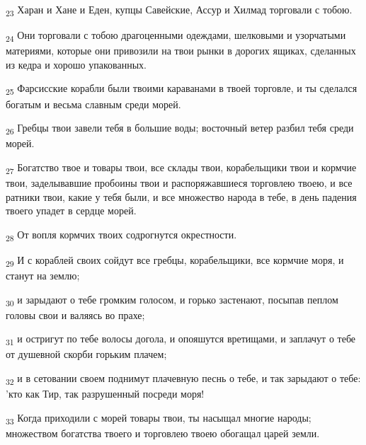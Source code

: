 \begin{tcolorbox}
\textsubscript{23} Харан и Хане и Еден, купцы Савейские, Ассур и Хилмад торговали с тобою.
\end{tcolorbox}
\begin{tcolorbox}
\textsubscript{24} Они торговали с тобою драгоценными одеждами, шелковыми и узорчатыми материями, которые они привозили на твои рынки в дорогих ящиках, сделанных из кедра и хорошо упакованных.
\end{tcolorbox}
\begin{tcolorbox}
\textsubscript{25} Фарсисские корабли были твоими караванами в твоей торговле, и ты сделался богатым и весьма славным среди морей.
\end{tcolorbox}
\begin{tcolorbox}
\textsubscript{26} Гребцы твои завели тебя в большие воды; восточный ветер разбил тебя среди морей.
\end{tcolorbox}
\begin{tcolorbox}
\textsubscript{27} Богатство твое и товары твои, все склады твои, корабельщики твои и кормчие твои, заделывавшие пробоины твои и распоряжавшиеся торговлею твоею, и все ратники твои, какие у тебя были, и все множество народа в тебе, в день падения твоего упадет в сердце морей.
\end{tcolorbox}
\begin{tcolorbox}
\textsubscript{28} От вопля кормчих твоих содрогнутся окрестности.
\end{tcolorbox}
\begin{tcolorbox}
\textsubscript{29} И с кораблей своих сойдут все гребцы, корабельщики, все кормчие моря, и станут на землю;
\end{tcolorbox}
\begin{tcolorbox}
\textsubscript{30} и зарыдают о тебе громким голосом, и горько застенают, посыпав пеплом головы свои и валяясь во прахе;
\end{tcolorbox}
\begin{tcolorbox}
\textsubscript{31} и остригут по тебе волосы догола, и опояшутся вретищами, и заплачут о тебе от душевной скорби горьким плачем;
\end{tcolorbox}
\begin{tcolorbox}
\textsubscript{32} и в сетовании своем поднимут плачевную песнь о тебе, и так зарыдают о тебе: 'кто как Тир, так разрушенный посреди моря!
\end{tcolorbox}
\begin{tcolorbox}
\textsubscript{33} Когда приходили с морей товары твои, ты насыщал многие народы; множеством богатства твоего и торговлею твоею обогащал царей земли.
\end{tcolorbox}
